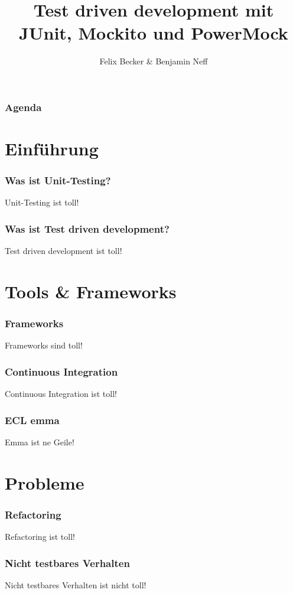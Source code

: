 \documentclass{beamer}
\title{Test driven development mit JUnit, Mockito und PowerMock}
\institute{Computerseminar Tondorf 2011}
\author[F. Becker, B. Neff]{
        Felix Becker \& 
	Benjamin Neff
}
\begin{document}
	\begin{frame}
		\titlepage
	\end{frame}

	\begin{frame}
		\frametitle{Agenda}
		\setcounter{tocdepth}{1}
		\tableofcontents
	\end{frame}
	

	\section{Einführung}
	
		\begin{frame}
			\frametitle{Was ist Unit-Testing?}
			Unit-Testing ist toll!
		\end{frame}

		\begin{frame}
			\frametitle{Was ist Test driven development?}
			Test driven development ist toll!
		\end{frame}

	
	\section{Tools \& Frameworks}
		\begin{frame}
			\frametitle{Frameworks}
			Frameworks sind toll!
		\end{frame}

		\begin{frame}
			\frametitle{Continuous Integration}
			Continuous Integration ist toll!
		\end{frame}

		\begin{frame}
			\frametitle{ECL emma}
			Emma ist ne Geile!
		\end{frame}

	
	\section{Probleme}
		\begin{frame}
			\frametitle{Refactoring}
			Refactoring ist toll!
		\end{frame}

		\begin{frame}
			\frametitle{Nicht testbares Verhalten}
			Nicht testbares Verhalten ist nicht toll!
		\end{frame}
\end{document}
